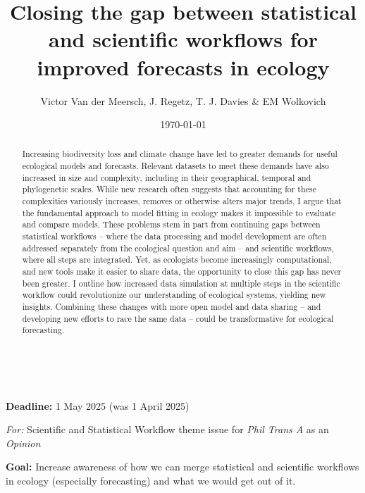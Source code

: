 \documentclass[11pt]{article}
\begin{document}
\renewcommand{\refname}{\CHead{}}

\title{Closing the gap between statistical and scientific workflows for improved forecasts in ecology } 
\date{\today}
\author{Victor Van der Meersch, J. Regetz, T. J. Davies \& EM Wolkovich}\\
 \maketitle

{\bf Deadline:} 1 May 2025 (was 1 April 2025)

\emph{For:} Scientific and Statistical Workflow theme issue for \emph{Phil Trans A} as an \emph{Opinion}

\begin{abstract}
Increasing biodiversity loss and climate change have led to greater demands for useful ecological models and forecasts. Relevant datasets to meet these demands have also increased in size and complexity, including in their geographical, temporal and phylogenetic scales. While new research often suggests that accounting for these complexities variously increases, removes or otherwise alters major trends, I argue that the fundamental approach to model fitting in ecology makes it impossible to evaluate and compare models. These problems stem in part from continuing gaps between statistical workflows -- where the data processing and model development are often addressed separately from the ecological question and aim -- and scientific workflows, where all steps are integrated. Yet, as ecologists become increasingly computational, and new tools make it easier to share data, the opportunity to close this gap has never been greater. I outline how increased data simulation at multiple steps in the scientific workflow could revolutionize our understanding of ecological systems, yielding new insights. Combining these changes with more open model and data sharing -- and developing new efforts to race the same data -- could be transformative for ecological forecasting. 
\end{abstract}

{\bf Goal:} Increase awareness of how we can merge statistical and scientific workflows in ecology (especially forecasting) and what we would get out of it.
\end{document}

